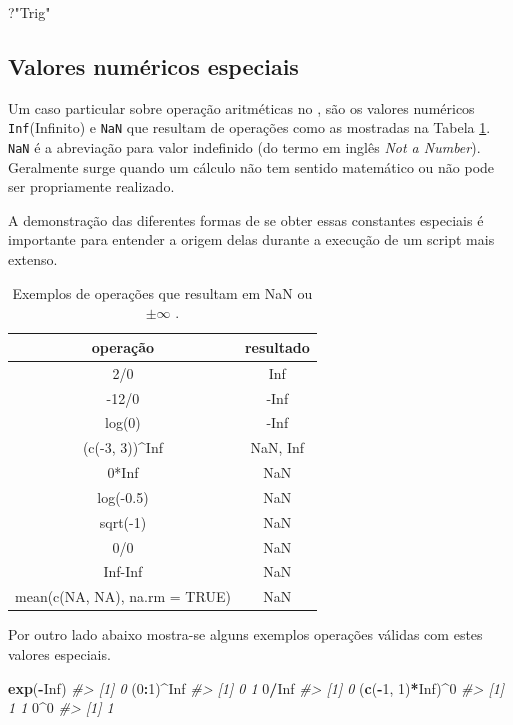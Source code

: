 \documentclass[]{book}
\newenvironment{Shaded}{\begin{snugshade}}{\end{snugshade}}
\newcommand{\KeywordTok}[1]{\textcolor[rgb]{0.13,0.29,0.53}{\textbf{#1}}}
\newcommand{\DecValTok}[1]{\textcolor[rgb]{0.00,0.00,0.81}{#1}}
\newcommand{\StringTok}[1]{\textcolor[rgb]{0.31,0.60,0.02}{#1}}
\newcommand{\CommentTok}[1]{\textcolor[rgb]{0.56,0.35,0.01}{\textit{#1}}}
\newcommand{\OtherTok}[1]{\textcolor[rgb]{0.56,0.35,0.01}{#1}}
\newcommand{\OperatorTok}[1]{\textcolor[rgb]{0.81,0.36,0.00}{\textbf{#1}}}
\newcommand{\NormalTok}[1]{#1}
\begin{document}
\begin{Shaded}
\begin{Highlighting}[]
\NormalTok{?}\StringTok{"Trig"}
\end{Highlighting}
\end{Shaded}

\subsection{Valores numéricos
especiais}\label{valores-numericos-especiais}

Um caso particular sobre operação aritméticas no , são os valores
numéricos \texttt{Inf}(Infinito) e \texttt{NaN} que resultam de
operações como as mostradas na Tabela \ref{tab:tab-num-esp}.
\texttt{NaN} é a abreviação para valor indefinido (do termo em inglês
\emph{Not a Number}). Geralmente surge quando um cálculo não tem sentido
matemático ou não pode ser propriamente realizado.

A demonstração das diferentes formas de se obter essas constantes
especiais é importante para entender a origem delas durante a execução
de um script mais extenso.

\begin{table}

\caption{\label{tab:tab-num-esp}Exemplos de operações que resultam em NaN ou $\pm\infty$ .}
\centering
\begin{tabular}[t]{c|c}
\hline
operação & resultado\\
\hline
2/0 & Inf\\
\hline
-12/0 & -Inf\\
\hline
log(0) & -Inf\\
\hline
(c(-3, 3))\textasciicircum{}Inf & NaN, Inf\\
\hline
0*Inf & NaN\\
\hline
log(-0.5) & NaN\\
\hline
sqrt(-1) & NaN\\
\hline
0/0 & NaN\\
\hline
Inf-Inf & NaN\\
\hline
mean(c(NA, NA), na.rm = TRUE) & NaN\\
\hline
\end{tabular}
\end{table}

Por outro lado abaixo mostra-se alguns exemplos operações válidas com
estes valores especiais.

\begin{Shaded}
\begin{Highlighting}[]
\KeywordTok{exp}\NormalTok{(}\OperatorTok{-}\OtherTok{Inf}\NormalTok{)}
\CommentTok{#> [1] 0}
\NormalTok{(}\DecValTok{0}\OperatorTok{:}\DecValTok{1}\NormalTok{)}\OperatorTok{^}\OtherTok{Inf}
\CommentTok{#> [1] 0 1}
\DecValTok{0}\OperatorTok{/}\OtherTok{Inf}
\CommentTok{#> [1] 0}
\NormalTok{(}\KeywordTok{c}\NormalTok{(}\OperatorTok{-}\DecValTok{1}\NormalTok{, }\DecValTok{1}\NormalTok{)}\OperatorTok{*}\OtherTok{Inf}\NormalTok{)}\OperatorTok{^}\DecValTok{0}
\CommentTok{#> [1] 1 1}
\DecValTok{0}\OperatorTok{^}\DecValTok{0}
\CommentTok{#> [1] 1}
\end{Highlighting}
\end{Shaded}
\end{document}
